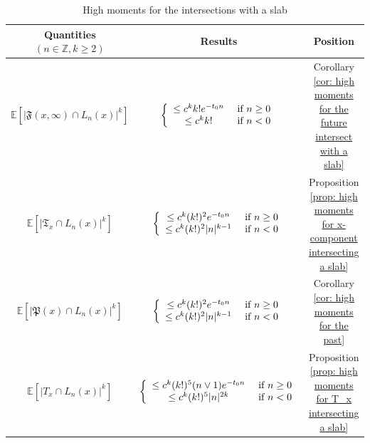 \documentclass[12pt]{article}
\numberwithin{equation}{section}
\newcommand{\1}{\mathbf{1}}
\begin{document}
 
  \begin{table}[ht]
 	\centering
 	\begin{tabular}{|c|c|c|}
 		\hline
 		Quantities $(n\in \mathbb{Z},k\geq2)$ & Results & Position\\
 			\hline
 		$\mathbb{E}[|\mathfrak{F}(x,\infty)\cap L_{n}(x)|^k]$ &  $\left\{
 		\begin{array}{cc}
 		\leq c^kk! e^{-t_0n} & \textnormal{ if }n\geq0\\
 		\leq c^kk! & \textnormal{ if }n<0\\
 		\end{array}
 		\right.$& Corollary \ref{cor: high moments for the future intersect with a slab} \\
 		\hline
 		$\mathbb{E}[|\mathfrak{T}_x\cap L_n(x)|^k]$ & $\left\{
 		\begin{array}{cc}
 		\leq c^k(k!)^2e^{-t_0n} & \textnormal{ if }n\geq0\\
 		\leq c^k(k!)^2|n|^{k-1}& \textnormal{ if }n<0\\
 		\end{array}
 		\right.$ & Proposition \ref{prop: high moments for x-component intersecting a slab}\\
 		\hline
 		$\mathbb{E}[|\mathfrak{P}(x)\cap L_n(x)|^k]$ &  $\left\{
 		\begin{array}{cc}
 		\leq c^k(k!)^2e^{-t_0n} & \textnormal{ if }n\geq0\\
 		\leq c^k(k!)^2|n|^{k-1}& \textnormal{ if }n<0\\
 		\end{array}
 		\right.$ & Corollary \ref{cor: high moments for the past} \\
 		\hline
 		$\mathbb{E}[|T_x\cap L_{n}(x)|^k]$ & $\left\{
 		\begin{array}{cc}
 		\leq c^k(k!)^5 (n\vee1)e^{-t_0n} & \textnormal{ if }n\geq0\\
 		\leq c^k(k!)^5|n|^{2k}& \textnormal{ if }n<0\\
 		\end{array}
 		\right.$ & Proposition \ref{prop: high moments for T_x intersecting a slab}\\
 		\hline
 	\end{tabular}
 \caption{High moments for the intersections with a slab}
 \label{table: high moments}
 \end{table}
 
\end{document}
